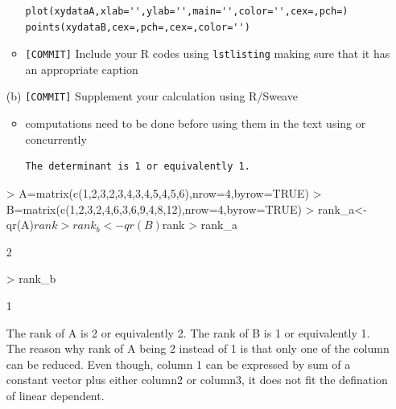 \documentclass[12pt]{article}
\begin{document}
\begin{itemize}
\begin{itemize}
\begin{lstlisting}
plot(xydataA,xlab='',ylab='',main='',color='',cex=,pch=)
points(xydataB,cex=,pch=,cex=,color='')
\end{lstlisting}
            \item \verb+[COMMIT]+  Include your R codes using \verb+lstlisting+ making sure that it has an appropriate caption
        \end{itemize}
    \item[(b)] \verb+[COMMIT]+  Supplement your calculation using R/Sweave
        \begin{itemize}
            \item computations need to be done before using them in the text
                using \verb++ or concurrently
\begin{lstlisting}
The determinant is 1 or equivalently 1.
\end{lstlisting}
        \end{itemize}
        
\begin{Schunk}
\begin{Sinput}
> A=matrix(c(1,2,3,2,3,4,3,4,5,4,5,6),nrow=4,byrow=TRUE)
> B=matrix(c(1,2,3,2,4,6,3,6,9,4,8,12),nrow=4,byrow=TRUE)        
> rank_a<-qr(A)$rank
> rank_b<-qr(B)$rank
> rank_a
\end{Sinput}
\begin{Soutput}
[1] 2
\end{Soutput}
\begin{Sinput}
> rank_b
\end{Sinput}
\begin{Soutput}
[1] 1
\end{Soutput}
\end{Schunk}
The rank of A is 2 or equivalently 2.
The rank of B is 1 or equivalently 1.\\
The reason why rank of A being 2 instead of 1 is that only one of the column can be reduced. Even though, column 1 can be expressed by sum of a constant vector plus either column2 or column3, it does not fit the defination of linear dependent. 


\end{itemize}
\end{document}
